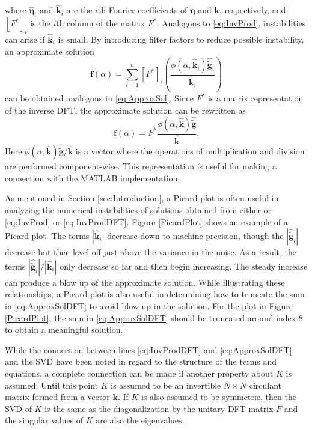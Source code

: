 \documentclass[12pt]{article}
\newcommand{\gnoise}{\widetilde{\mathbf{g}}}
\newcommand{\kdis}{\mathbf{k}}
\newcommand{\kmat}{K}	%
\newcommand{\fdis}{\mathbf{f}}
\newcommand{\regparam}{\alpha}
\newcommand{\filt}{\phi}
\newcommand{\noise}{\bm{\eta}}	%
\begin{document}
where $\widehat{\noise}_i$ and $\widehat{\kdis}_i$ are the $i$th Fourier coefficients of $\noise$ and $\kdis$, respectively, and $[F^*]_i$ is the $i$th column of the matrix $F^*$. Analogous to \eqref{eq:InvProd}, instabilities can arise if $\widehat{\kdis}_i$ is small. By introducing filter factors to reduce possible instability, an approximate solution
\begin{equation}
\fdis(\regparam) = \sum_{i = 1}^n [F^*]_i\left(\frac{\filt(\regparam,\widehat{\kdis}_i)\widehat{\gnoise}_i}{\widehat{\kdis}_i}\right)
\label{eq:ApproxSolDFT}
\end{equation}
can be obtained analogous to \eqref{eq:ApproxSol}. 
Since $F^*$ is a matrix representation of the inverse DFT, the approximate solution can be rewritten as
\[\fdis(\regparam) = F^* \frac{\filt(\regparam,\widehat{\kdis})\widehat{\gnoise}}{\widehat{\kdis}}.\]
Here $\filt(\regparam,\widehat{\kdis})\widehat{\gnoise}/{\widehat{\kdis}}$ is a vector where the operations of multiplication and division are performed component-wise. This representation is useful for making a connection with the MATLAB implementation. \par
As mentioned in Section \ref{sec:Introduction}, a Picard plot is often useful in analyzing the numerical instabilities of solutions obtained from either or \eqref{eq:InvProd} or \eqref{eq:InvProdDFT}. Figure \ref{PicardPlot} shows an example of a Picard plot. The terms $|\widehat{\kdis}_i|$ decrease down to machine precision, though the $|\widehat{\gnoise}_i|$ decrease but then level off just above the variance in the noise. As a result, the terms $|\widehat{\gnoise}_i|/|\widehat{\kdis}_i|$ only decrease so far and then begin increasing. The steady increase can produce a blow up of the approximate solution. While illustrating these relationships, a Picard plot is also useful in determining how to truncate the sum in \eqref{eq:ApproxSolDFT} to avoid blow up in the solution. For the plot in Figure \ref{PicardPlot}, the sum in \eqref{eq:ApproxSolDFT} should be truncated around index 8 to obtain a meaningful solution. \par 
While the connection between lines \eqref{eq:InvProdDFT} and \eqref{eq:ApproxSolDFT} and the SVD have been noted in regard to the structure of the terms and equations, a complete connection can be made if another property about $\kmat$ is assumed. Until this point $\kmat$ is assumed to be an invertible $N \times N$ circulant matrix formed from a vector $\kdis$. If $\kmat$ is also assumed to be symmetric, then the SVD of $\kmat$ is the same as the diagonalization by the unitary DFT matrix $F$ and the singular values of $\kmat$ are also the eigenvalues. \par 
\end{document}
